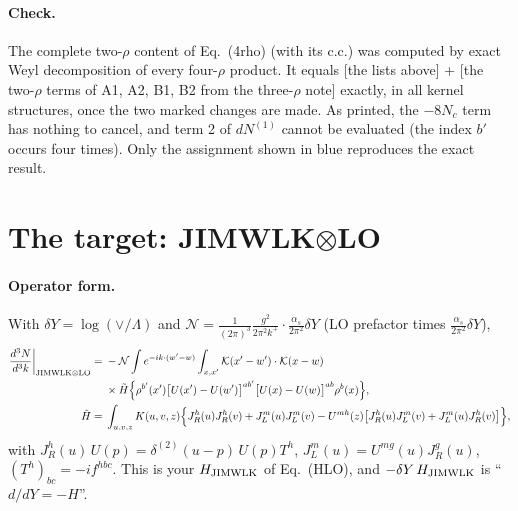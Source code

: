 \documentclass[10pt]{article}
\numberwithin{equation}{section}
\newcommand{\KK}{\mathcal K}
\newcommand{\NN}{\mathcal N}
\begin{document}
\paragraph{Check.} The complete two-$\rho$ content of Eq.~(4rho) (with its c.c.) was computed by exact Weyl decomposition of every four-$\rho$ product. It equals [the lists above] + [the two-$\rho$ terms of A1, A2, B1, B2 from the three-$\rho$ note] exactly, in all kernel structures, once the two marked changes are made. As printed, the $-8N_c$ term has nothing to cancel, and term 2 of $dN^{(1)}$ cannot be evaluated (the index $b'$ occurs four times). Only the assignment shown in blue reproduces the exact result.

\section{The target: JIMWLK\texorpdfstring{$\otimes$}{x}LO}\label{sec:target}
\paragraph{Operator form.} With $\delta Y=\log(\vee/\Lambda)$ and $\NN=\frac{1}{(2\pi)^3}\frac{g^2}{2\pi^2k^+}\cdot\frac{\alpha_s}{2\pi^2}\delta Y$ (LO prefactor times $\frac{\alpha_s}{2\pi^2}\delta Y$),
\begin{align}
\frac{d^3N}{d^3k}\bigg|_{\rm JIMWLK\otimes LO}={}&-\NN\int e^{-ik\cdot(w'-w)}\int_{x,x'}\KK(x'-w')\cdot\KK(x-w)\notag\\
&\times\tilde H\Big\{\rho^{b'}(x')\big[U(x')-U(w')\big]^{ab'}\big[U(x)-U(w)\big]^{ab}\rho^b(x)\Big\},\notag\\
\tilde H={}&\int_{u,v,z}K(u,v,z)\Big\{J_R^h(u)J_R^h(v)+J_L^m(u)J_L^m(v)-U^{mh}(z)\big[J_R^h(u)J_L^m(v)+J_L^m(u)J_R^h(v)\big]\Big\},
\end{align}
with $J_R^h(u)\,U(p)=\delta^{(2)}(u-p)\,U(p)T^h$, $J_L^m(u)=U^{mg}(u)J_R^g(u)$, $(T^h)_{bc}=-if^{hbc}$. This is your $H_{\rm JIMWLK}$ of Eq.~(HLO), and $-\delta Y\,H_{\rm JIMWLK}$ is ``$d/dY=-H$''.
\end{document}

